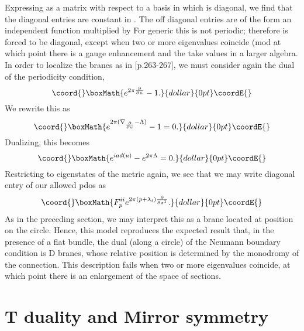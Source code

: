 \documentclass[a4paper,11pt]{amsart}
\begin{document}
Expressing \coordHE{} as a matrix with respect to a basis in which \myHighlight{$\Lambda$}\coordHE{} is 
diagonal, we find that the diagonal entries \coordHE{} are constant in \coordHE{}. 
The off diagonal entries \coordHE{} are of the form an \coordHE{} independent
function multiplied by \coordHE{} For generic \myHighlight{$\Lambda$}\coordHE{} 
this is not periodic; therefore \coordHE{} is forced to be diagonal, except when two
or more eigenvalues coincide (mod \coordHE{} at which point there is a gauge
enhancement and the \coordHE{} take values in a larger algebra. In order to localize 
the branes as in \cite{P}[p.263-267], we must consider again the \coordHE{} dual of the
periodicity condition, 
$$\coord{}\boxMath{e^{2\pi\frac{\partial}{\partial u}} - 1.}{dollar}{0pt}\coordE{}$$
We rewrite this as 
$$\coord{}\boxMath{e^{2\pi(\nabla_{\frac{\partial}{\partial u}}-\Lambda)} - 1 = 0.}{dollar}{0pt}\coordE{}$$
Dualizing, this becomes 
$$\coord{}\boxMath{e^{i ad(u)} - e^{2\pi\Lambda} = 0.}{dollar}{0pt}\coordE{}$$
Restricting to eigenstates of the metric again, we see that we may write 
\coordHE{} diagonal entry of our allowed pdos as 
$$\coord{}\boxMath{F_p^{ii}e^{2\pi(p+\lambda_i)\frac{\partial}{\partial x^1}}.}{dollar}{0pt}\coordE{}$$
 As in the preceding section, we may
 interpret this as a brane located at position \coordHE{} on the circle. 
Hence,  this model reproduces
the expected result that, in the presence of a flat \coordHE{} bundle,
 the \coordHE{} dual (along a circle) of the Neumann boundary
condition is \coordHE{} D branes, whose relative position is determined by the
monodromy of the connection. 
This description fails when two or more eigenvalues
coincide, at which point there is an enlargement of the space of sections. 

\section{T duality and Mirror symmetry}\label{TDM}
\end{document}
